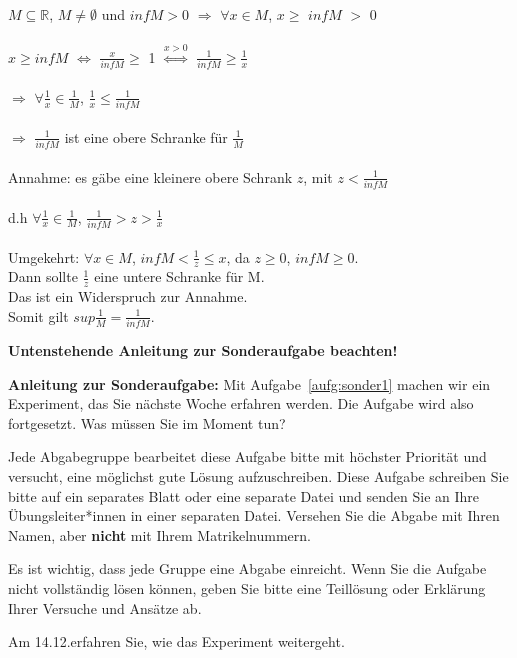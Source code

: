 \begin{lsg}
$M\subseteq\mathbb{R}$, $M\neq\emptyset$ und $infM>0$ $\Rightarrow$ $\forall x\in M$, $x\geq$ $infM$ $>$ $0$\\
\\
$x\geq infM$ $\Leftrightarrow$ $\frac{x}{infM}\geq$ 1 $\stackrel{x>0}\Longleftrightarrow$ $\frac{1}{infM}\geq\frac{1}{x}$\\ 
\\
$\Rightarrow$ $\forall \frac{1}{x}\in \frac{1}{M}$, $\frac{1}{x}\leq\frac{1}{infM}$\\
\\
$\Rightarrow$ $\frac{1}{infM}$ ist eine obere Schranke für $\frac{1}{M}$\\
\\
Annahme: es gäbe eine kleinere obere Schrank $z$, mit $z<\frac{1}{infM}$\\
\\
d.h $\forall \frac{1}{x}\in\frac{1}{M}$, $\frac{1}{infM}>z>\frac{1}{x}$\\
\\
Umgekehrt: $\forall x\in M$, $infM <\frac{1}{z}\leq x$, da $z\geq0$, $infM\geq0$.\\
Dann sollte $\frac{1}{z}$ eine untere Schranke für M.\\
Das ist ein Widerspruch zur Annahme.\\
Somit gilt $sup\frac{1}{M}=\frac{1}{infM}$.\\
\end{lsg}

\bigskip 

\begin{center}
 {\large\textbf{Untenstehende Anleitung zur Sonderaufgabe beachten!}}
\end{center}

\bigskip


\noindent
\textbf{Anleitung zur Sonderaufgabe:} Mit Aufgabe~\ref{aufg:sonder1} machen wir ein Experiment, das Sie n\"achste Woche erfahren werden. Die Aufgabe wird also fortgesetzt. Was m\"ussen Sie im Moment tun?

Jede Abgabegruppe bearbeitet diese Aufgabe bitte mit h\"ochster Priorit\"at und versucht, eine m\"oglichst gute L\"osung aufzuschreiben. Diese Aufgabe schreiben Sie bitte auf ein separates Blatt oder eine separate Datei und senden Sie an Ihre \"Ubungsleiter*innen in einer separaten Datei. Versehen Sie die Abgabe mit Ihren Namen, aber \textbf{nicht} mit Ihrem Matrikelnummern. 

Es ist wichtig, dass jede Gruppe eine Abgabe einreicht. Wenn Sie die Aufgabe nicht vollst\"andig l\"osen k\"onnen, geben Sie bitte eine Teill\"osung oder Erkl\"arung Ihrer Versuche und Ans\"atze ab.

Am 14.12.\@ erfahren Sie, wie das Experiment weitergeht.

